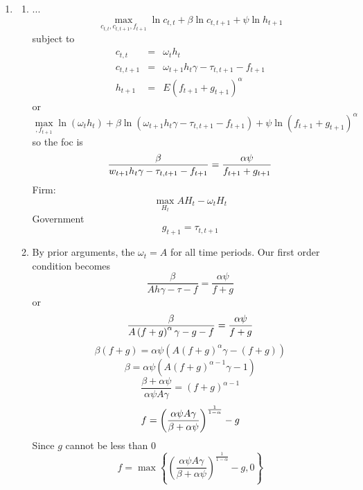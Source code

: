 \documentclass[12pt]{article}
\begin{document}
\begin{enumerate}
\item 
\begin{enumerate}
\item ...%
\begin{equation*}
\underset{c_{t,t},c_{t,t+1},f_{t+1}}{\max }\ln c_{t,t}+\beta \ln
c_{t,t+1}+\psi \ln h_{t+1}
\end{equation*}%
subject to%
\begin{eqnarray*}
c_{t,t} &=&\omega _{t}h_{t} \\
c_{t,t+1} &=&\omega _{t+1}h_{t}\gamma -\tau _{t,t+1}-f_{t+1} \\
h_{t+1} &=&E\left( f_{t+1}+g_{t+1}\right) ^{\alpha }
\end{eqnarray*}%
or 
\begin{equation*}
\underset{,f_{t+1}}{\max }\ln \left( \omega _{t}h_{t}\right) +\beta \ln
\left( \omega _{t+1}h_{t}\gamma -\tau _{t,t+1}-f_{t+1}\right) +\psi \ln
\left( f_{t+1}+g_{t+1}\right) ^{\alpha }
\end{equation*}%
so the foc is 
\begin{equation*}
\frac{\beta }{w_{t+1}h_{t}\gamma -\tau _{t,t+1}-f_{t+1}}=\frac{\alpha \psi }{%
f_{t+1}+g_{t+1}}
\end{equation*}%
Firm:%
\begin{equation*}
\underset{H_{t}}{\max }AH_{t}-\omega _{t}H_{t}
\end{equation*}%
Government%
\begin{equation*}
g_{t+1}=\tau _{t,t+1}
\end{equation*}

\item By prior arguments, the $\omega _{t}=A$ for all time periods. Our
first order condition becomes 
\begin{equation*}
\frac{\beta }{Ah\gamma -\tau -f}=\frac{\alpha \psi }{f+g}
\end{equation*}%
or 
\begin{equation*}
\frac{\beta }{A\left( f+g\right) ^{\alpha }\gamma -g-f}=\frac{\alpha \psi }{%
f+g}
\end{equation*}%
\begin{equation*}
\beta \left( f+g\right) =\alpha \psi \left( A\left( f+g\right) ^{\alpha
}\gamma -\left( f+g\right) \right)
\end{equation*}%
\begin{equation*}
\beta =\alpha \psi \left( A\left( f+g\right) ^{\alpha -1}\gamma -1\right)
\end{equation*}%
\begin{equation*}
\frac{\beta +\alpha \psi }{\alpha \psi A\gamma }=\left( f+g\right) ^{\alpha
-1}
\end{equation*}%
\begin{equation*}
f=\left( \frac{\alpha \psi A\gamma }{\beta +\alpha \psi }\right) ^{\frac{1}{%
1-\alpha }}-g
\end{equation*}%
Since $g$ cannot be less than 0%
\begin{equation*}
f=\max \left\{ \left( \frac{\alpha \psi A\gamma }{\beta +\alpha \psi }%
\right) ^{\frac{1}{1-\alpha }}-g,0\right\}
\end{equation*}


\end{enumerate}
\end{enumerate}
\end{document}
